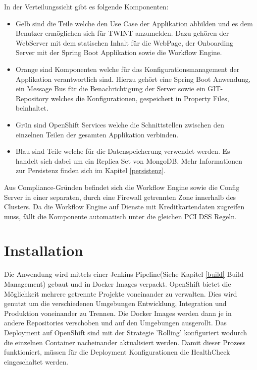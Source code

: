 In der Verteilungssicht gibt es folgende Komponenten:\newline
\begin{itemize}
	\item Gelb sind die Teile welche den Use Case der Applikation abbilden und es dem Benutzer ermöglichen sich für TWINT anzumelden. Dazu gehören der WebServer mit dem statischen Inhalt für die WebPage, der Onboarding Server mit der Spring Boot Applikation sowie die Workflow Engine.
	\item Orange sind Komponenten welche für das Konfigurationsmanagement der Applikation verantwortlich sind. Hierzu gehört eine Spring Boot Anwendung, ein Message Bus für die Benachrichtigung der Server sowie ein GIT-Repository welches die Konfigurationen, gespeichert in Property Files, beinhaltet.
	\item Grün sind OpenShift Services welche die Schnittstellen zwischen den einzelnen Teilen der gesamten Applikation verbinden.
	\item Blau sind Teile welche für die Datenspeicherung verwendet werden. Es handelt sich dabei um ein Replica Set von MongoDB. Mehr Informationen zur Persistenz finden sich im Kapitel \ref{persistenz}.
\end{itemize}

Aus Compliance-Gründen befindet sich die Workflow Engine sowie die Config Server in einer separaten, durch eine Firewall getrennten Zone innerhalb des Clusters. Da die Workflow Engine auf Dienste mit Kreditkartendaten zugreifen muss, fällt die Komponente automatisch unter die gleichen PCI DSS Regeln. 

\section{Installation}

Die Anwendung wird mittels einer Jenkins Pipeline(Siehe Kapitel \ref{build} Build Management) gebaut und in Docker Images verpackt. OpenShift bietet die Möglichkeit mehrere getrennte Projekte voneinander zu verwalten. Dies wird genutzt um die verschiedenen Umgebungen Entwicklung, Integration und Produktion voneinander zu Trennen. Die Docker Images werden dann je in andere Repositories verschoben und auf den Umgebungen ausgerollt. {\color{red}Das Deployment auf OpenShift sind mit der Strategie 'Rolling' konfiguriert wodurch die einzelnen Container nacheinander aktualisiert werden. Damit dieser Prozess funktioniert, müssen für die Deployment Konfigurationen die HealthCheck eingeschaltet werden.}

